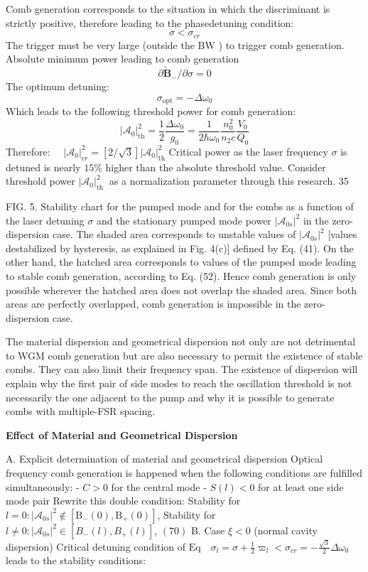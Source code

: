 \documentclass[main.tex]{subfiles}
\begin{document}
Comb generation corresponds to the situation in which the discriminant is strictly positive, therefore leading to the phasedetuning condition:
$$
\sigma<\sigma_{c r}
$$
The trigger must be very large (outside the $\mathrm{BW}$ ) to trigger comb generation.
Absolute minimum power leading to comb generation
$$
\partial \tilde{\mathbf{B}}_{-} / \partial \sigma=0
$$
The optimum detuning:
$$
\sigma_{\mathrm{opt}}=-\Delta \omega_0
$$
Which leads to the following threshold power for comb generation:
$$
\left|\mathcal{A}_0\right|_{\mathrm{th}}^2=\frac{1}{2} \frac{\Delta \omega_0}{g_0}=\frac{1}{2 \hbar \omega_0} \frac{n_0^2}{n_2 c} \frac{V_0}{Q_0}
$$
Therefore: $\quad\left|\mathcal{A}_0\right|_{c r}^2=[2 / \sqrt{3}]\left|\mathcal{A}_0\right|_{\mathrm{th}}^2$
Critical power as the laser frequency $\sigma$ is detuned is nearly $15 \%$ higher than the absolute threshold value.
Consider threshold power $\left|\mathcal{A}_0\right|_{\text {th }}^2$ as a normalization parameter through this research.
35

FIG. 5. Stability chart for the pumped mode and for the combs as a function of the laser detuning $\sigma$ and the stationary pumped mode power $\left|\mathcal{A}_{0 s}\right|^2$ in the zero-dispersion case. The shaded area corresponds to unstable values of $\left|\mathcal{A}_{0 s}\right|^2$ [values destabilized by hysteresis, as explained in Fig. 4(c)] defined by Eq. (41). On the other hand, the hatched area corresponds to values of the pumped mode leading to stable comb generation, according to Eq. (52). Hence comb generation is only possible wherever the hatched area does not overlap the shaded area. Since both areas are perfectly overlapped, comb generation is impossible in the zero-dispersion case.

The material dispersion and geometrical dispersion not only are not detrimental to WGM comb generation but are also necessary to permit the existence of stable combs. They can also limit their frequency span. The existence of dispersion will explain why the first pair of side modes to reach the oscillation threshold is not necessarily the one adjacent to the pump and why it is possible to generate combs with multiple-FSR spacing.

\textbf{Effect of Material and Geometrical Dispersion}

A. Explicit determination of material and geometrical dispersion
Optical frequency comb generation is happened when the following conditions are fulfilled simultaneously:
- $C>0$ for the central mode
- $S(l)<0$ for at least one side mode pair
Rewrite this double condition:
Stability for $l=0:\left|\mathcal{A}_{0 s}\right|^2 \notin\left[\mathrm{B}_{-}(0), \mathrm{B}_{+}(0)\right]$,
Stability for $l \neq 0:\left|\mathcal{A}_{0 s}\right|^2 \in\left[B_{-}(l), B_{+}(l)\right]$,
$(70)$
B. Case $\xi<0$ (normal cavity dispersion)
Critical detuning condition of $\mathrm{Eq} \quad \sigma_l=\sigma+\frac{1}{2} \varpi_l<\sigma_{c r}=-\frac{\sqrt{3}}{2} \Delta \omega_0$ leads to the stability conditions:
\end{document}
